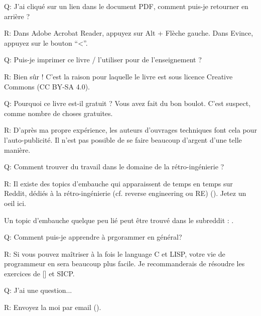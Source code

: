 \par Q: J'ai cliqué sur un lien dans le document PDF, comment puis-je retourner en arrière ?
\par R: Dans Adobe Acrobat Reader, appuyez sur Alt + Flèche gauche. Dans Evince, appuyez sur le bouton ``<''.

\par Q: Puis-je imprimer ce livre / l'utiliser pour de l'enseignement ?
\par R: Bien sûr ! C'est la raison pour laquelle le livre est sous licence Creative Commons (CC BY-SA 4.0).

\par Q: Pourquoi ce livre est-il gratuit ? Vous avez fait du bon boulot. C'est suspect, comme nombre de choses gratuites.
\par R: D'après ma propre expérience, les auteurs d'ouvrages techniques font cela pour l'auto-publicité. Il n'est pas possible de se faire beaucoup d'argent d'une telle manière.

\par Q: Comment trouver du travail dans le domaine de la rétro-ingénierie ?
\par R: Il existe des topics d'embauche qui apparaissent de temps en temps sur Reddit, dédiés à la rétro-ingénierie (cf. reverse engineering ou RE)\FNURLREDDIT{}
(\RedditHiringThread{}).
Jetez un oeil ici.

Un topic d'embauche quelque peu lié peut être trouvé dans le subreddit : \NetsecHiringThread{}.

\par Q: Comment puis-je apprendre à prgorammer en général?
\par R: Si vous pouvez maîtriser à la fois le language C et LISP, votre vie de programmeur en sera beaucoup plus facile.
Je recommanderais de résoudre les exercices de [\KRBook] et \ac{SICP}.

\par Q: J'ai une question...
\par R: Envoyez la moi par email (\EMAIL).

